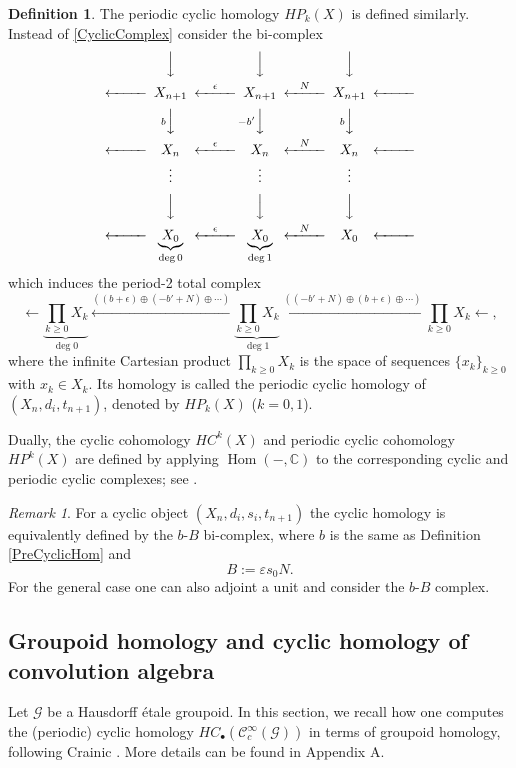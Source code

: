 \documentclass[a4paper]{amsart}
\newcommand{\CC}{\mathbb C}
\newcommand{\maC}{\mathcal C}
\newcommand{\maG}{\mathcal G}
\newcommand\<{\langle}
\renewcommand\>{\rangle}
\theoremstyle{definition}
\newtheorem{dfn}[theorem]{Definition}
\theoremstyle{remark}
\newtheorem{rem}[theorem]{Remark}
\begin{document}
\begin{dfn}
The periodic cyclic homology $H P _k (X)$ is defined similarly.
Instead of \eqref{CyclicComplex} consider the bi-complex \cite[Section 5.1.1]{Loday;Book}
$$
\begin{CD}
@. @VVV @VVV @VVV @. \\
@<<< X _{n+1} @<{\epsilon}<< X _{n+1} @<{N}<< X _{n+1} @<<< \\
@. @V{b}VV @V{-b'}VV @V{b}VV @. \\
@<<< X _{n} @<{\epsilon}<< X _{n} @<{N}<< X _{n} @<<< \\
@. \vdots @. \vdots @. \vdots @. \\
@. @VVV @VVV @VVV @. \\
@<<< \underbrace{X _{0}}_{\deg 0} @<{\epsilon}<< \underbrace{X _{0}}_{\deg 1} @<{N}<< X _{0} @<<<
\end{CD}
$$
which induces the period-2 total complex
$$ \leftarrow \underbrace{\prod _{k \geq 0} X_k}_{\deg 0} \xleftarrow{((b + \epsilon) \oplus (-b'+N) \oplus \cdots)}
\underbrace{\prod _{k \geq 0} X_k}_{\deg 1} \xleftarrow{((-b'+N) \oplus (b + \epsilon) \oplus \cdots)}
\prod _{k \geq 0} X_k \leftarrow ,$$
where the infinite Cartesian product $\prod _{k \geq 0} X_k $ is the space of sequences $\{ x_k \}_{k \geq 0}$ with $x_k \in X_k$.
Its homology is called the periodic cyclic homology of $(X_n , d_i , t_{n+1})$, denoted by $H P _k (X)$ ($k = 0, 1$).
\end{dfn}


Dually, the cyclic cohomology $H C ^k (X)$ and periodic cyclic cohomology $H P ^k (X)$ are defined by applying
$\operatorname{Hom}(-,\CC)$ to the corresponding cyclic and periodic cyclic complexes; see \cite{Loday;Book}.

\begin{rem}
For a cyclic object $(X _n , d_i , s_i , t_{n+1})$ the cyclic homology is equivalently defined by the $b$-$B$ bi-complex,
where $b$ is the same as Definition \ref{PreCyclicHom} and
$$B := \varepsilon s _0 N .$$
For the general case one can also adjoint a unit and consider the $b$-$B$ complex.
\end{rem}


\subsection{Groupoid homology and cyclic homology of convolution algebra}
\label{Crainic}
Let $\maG$ be a Hausdorff \'etale groupoid.
In this section, we recall how one computes the (periodic) cyclic homology $H C _\bullet (\maC^\infty_c (\maG))$
in terms of groupoid homology,
following Crainic \cite{Crainic;EtaleGpoid}.
More details can be found in Appendix A.
\end{document}

